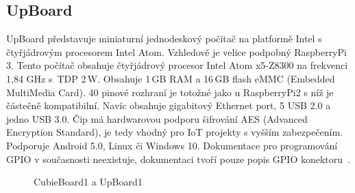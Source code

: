 
\subsection{UpBoard}
		UpBoard představuje miniaturní jednodeskový počítač na platformě Intel s čtyřjádrovým procesorem Intel Atom. Vzhledově je velice podpobný RaspberryPi 3. 
		Tento počítač obsahuje čtyřjádrový procesor Intel Atom x5-Z8300 na frekvenci 1,84 GHz s~TDP 2\,W. Obsahuje 1\,GB RAM a 16\,GB flash eMMC (Embedded MultiMedia Card). 40 pinové rozhraní je totožné jako u RaspberryPi2 s níž je částečně kompatibilní. Navíc obsahuje gigabitový Ethernet port, 5 USB 2.0 a jedno USB 3.0. Čip má hardwarovou podporu šifrování AES (Advanced Encryption Standard), je tedy vhodný pro IoT projekty s vyšším zabezpečením. Podporuje Android 5.0, Linux či Windows 10. Dokumentace pro programování GPIO v současnosti neexistuje, dokumentaci tvoří pouze popis GPIO konektoru~\cite{UpBoard}.

	\begin{figure}[!ht]
	\vspace{-10pt}	
    \centering
			\hspace*{5mm}
			\caption{CubieBoard1 a UpBoard1}
			\vspace{-10pt}	
\end{figure}
		

